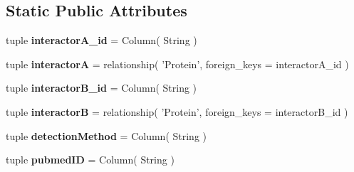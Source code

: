 \subsection*{Static Public Attributes}
\begin{DoxyCompactItemize}
\item 
\hypertarget{classsrc_1_1fr_1_1tagc_1_1rainet_1_1core_1_1data_1_1ProteinInteraction_1_1ProteinInteraction_ad64502b4b96b9ba28258919eceb3ced6}{tuple {\bfseries interactor\-A\-\_\-id} = Column( String )}\label{classsrc_1_1fr_1_1tagc_1_1rainet_1_1core_1_1data_1_1ProteinInteraction_1_1ProteinInteraction_ad64502b4b96b9ba28258919eceb3ced6}

\item 
\hypertarget{classsrc_1_1fr_1_1tagc_1_1rainet_1_1core_1_1data_1_1ProteinInteraction_1_1ProteinInteraction_a6d9066b2c4d2c3ce9871c9581dfda6e5}{tuple {\bfseries interactor\-A} = relationship( 'Protein', foreign\-\_\-keys = interactor\-A\-\_\-id )}\label{classsrc_1_1fr_1_1tagc_1_1rainet_1_1core_1_1data_1_1ProteinInteraction_1_1ProteinInteraction_a6d9066b2c4d2c3ce9871c9581dfda6e5}

\item 
\hypertarget{classsrc_1_1fr_1_1tagc_1_1rainet_1_1core_1_1data_1_1ProteinInteraction_1_1ProteinInteraction_a2fa1e65fc4f39412c078088a62a8e258}{tuple {\bfseries interactor\-B\-\_\-id} = Column( String )}\label{classsrc_1_1fr_1_1tagc_1_1rainet_1_1core_1_1data_1_1ProteinInteraction_1_1ProteinInteraction_a2fa1e65fc4f39412c078088a62a8e258}

\item 
\hypertarget{classsrc_1_1fr_1_1tagc_1_1rainet_1_1core_1_1data_1_1ProteinInteraction_1_1ProteinInteraction_a6d8175af77751971c0a19fb2ac04317d}{tuple {\bfseries interactor\-B} = relationship( 'Protein', foreign\-\_\-keys = interactor\-B\-\_\-id )}\label{classsrc_1_1fr_1_1tagc_1_1rainet_1_1core_1_1data_1_1ProteinInteraction_1_1ProteinInteraction_a6d8175af77751971c0a19fb2ac04317d}

\item 
\hypertarget{classsrc_1_1fr_1_1tagc_1_1rainet_1_1core_1_1data_1_1ProteinInteraction_1_1ProteinInteraction_a6c8d682b6d0957d0d49fa7c37747d6ab}{tuple {\bfseries detection\-Method} = Column( String )}\label{classsrc_1_1fr_1_1tagc_1_1rainet_1_1core_1_1data_1_1ProteinInteraction_1_1ProteinInteraction_a6c8d682b6d0957d0d49fa7c37747d6ab}

\item 
\hypertarget{classsrc_1_1fr_1_1tagc_1_1rainet_1_1core_1_1data_1_1ProteinInteraction_1_1ProteinInteraction_a9bf48dd5c0454325f006bf9c2627de62}{tuple {\bfseries pubmed\-I\-D} = Column( String )}\label{classsrc_1_1fr_1_1tagc_1_1rainet_1_1core_1_1data_1_1ProteinInteraction_1_1ProteinInteraction_a9bf48dd5c0454325f006bf9c2627de62}


\end{DoxyCompactItemize}
